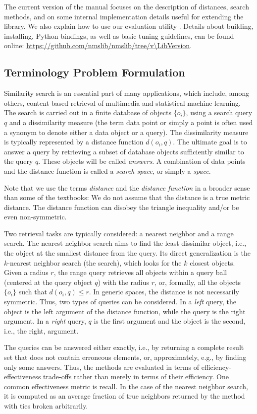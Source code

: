 The current version of the manual focuses on the description of distances, search methods,
and on some internal implementation details useful for extending the library.
We also explain how to use our evaluation utility .
Details about building, installing, Python bindings, as well as basic
tuning guidelines, can be found online: \url{https://github.com/nmslib/nmslib/tree/v\LibVersion}.


\subsection{Terminology Problem Formulation}\label{SectionProbForm}
Similarity search is an essential part of many applications,
which include, among others,  
content-based retrieval of multimedia  and statistical machine learning.
The search is carried out in a finite database of objects $\{o_i\}$,
using a search query $q$ and a dissimilarity measure (the term data point or simply a point is often
used a synonym to denote either a data object or a query).
 The dissimilarity measure is typically represented by a distance function $d(o_i, q)$. 
The ultimate goal is to answer a query by retrieving a subset of database objects sufficiently similar to the query $q$.
These objects will be called \emph{answers}.
A combination of data points and the distance function is called a \emph{search space},
or simply a \emph{space}.


Note that we use the terms \emph{distance} and the \emph{distance function} in a broader sense than
some of the textbooks:
We do not assume that the distance is a true metric distance. 
The distance function can disobey the triangle inequality and/or be even non-symmetric.

Two retrieval tasks are typically considered: a nearest neighbor and a range search. 
The nearest neighbor search aims to find the least dissimilar object,
i.e., the object at the smallest distance from the query.
Its direct generalization is the $k$-nearest neighbor search (the \knn search),
which looks for the $k$  closest objects.
Given a radius $r$, 
the range query retrieves all objects within a query ball (centered at the query object $q$) with the radius $r$,
or, formally, all the objects~$\lbrace o_i \rbrace$ such that $d(o_i, q) \le r$. 
In generic spaces, the distance is not necessarily symmetric. 
Thus, two types of queries can be considered. 
In a  \emph{left} query, the object is the left argument of the distance function,
while the query is the right argument.
In a \emph{right} query, $q$ is the first argument and the object is the second, i.e.,
the right, argument.

The queries can be answered either exactly, 
i.e., by returning a complete result set that does not contain erroneous elements, or, 
approximately, e.g., by finding only some answers.
Thus, the methods are evaluated in terms of efficiency-effectiveness trade-offs
rather than merely in terms of their efficiency.
One common effectiveness metric is recall. In the case
of the nearest neighbor search, it is computed as
an average fraction of true neighbors returned by the method with ties broken arbitrarily.
